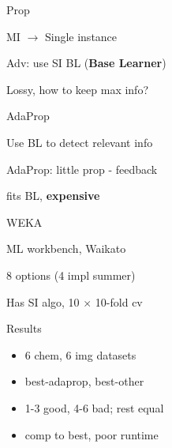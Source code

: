 \documentclass[13pt,handout]{beamer}
\newenvironment{wideitemize}{\itemize\addtolength{\itemsep}{20pt}}{\enditemize}
\begin{document}

\begin{frame}{Prop}
\begin{wideitemize}
    \item MI $\to$ Single instance
    \item Adv: use SI BL ({\bf Base Learner})
    \item Lossy, how to keep max info?
\end{wideitemize}
\end{frame}

\begin{frame}{AdaProp}
\begin{wideitemize}
    \item Use BL to detect relevant info
    \item AdaProp: little prop - feedback
    \item fits BL, {\bf expensive}
\end{wideitemize}
\end{frame}

\begin{frame}{WEKA}
\begin{wideitemize}
    \item ML workbench, Waikato
    \item 8 options (4 impl summer)
    \item Has SI algo, 10 $\times$ 10-fold cv
\end{wideitemize}
\end{frame}


\begin{frame}{Results}
\begin{itemize}
    \item 6 chem, 6 img datasets
    \item best-adaprop, best-other
    \item 1-3 good, 4-6 bad; rest equal
    \item comp to best, poor runtime
\end{itemize}
\end{frame}

\end{document}
